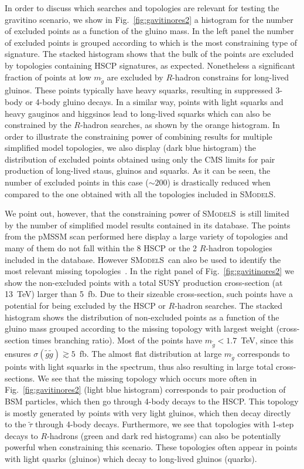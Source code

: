 \documentclass[preprint,number,sort&compress,twocolumn,3p]{elsstyarticle}
\newcommand{\smo}{\textsc{SModelS}}
\begin{document}
In order to discuss which searches and topologies are relevant for testing the gravitino scenario, we show in Fig.~\ref{fig:gavitinores2} a histogram for the number of excluded points as a function of the gluino mass. 
In the left panel the number of excluded points is grouped according to which is the most constraining type of signature. The stacked histogram shows that the bulk of the points are excluded by topologies containing HSCP signatures, as expected.
Nonetheless a significant fraction of points at low $m_{\tilde g}$ are excluded by $R$-hadron constrains for long-lived gluinos. These points typically have heavy squarks, resulting in suppressed 3-body or 4-body gluino decays. In a similar way, points with light squarks and heavy gauginos and higgsinos lead to long-lived squarks which can also be constrained by the $R$-hadron searches, as shown by the orange histogram.
In order to illustrate the constraining power of combining results for multiple simplified model topologies, we also display (dark blue histogram) the distribution of excluded points obtained using only the CMS limits for pair production of long-lived staus, gluinos and squarks.
As it can be seen, the number of excluded points in this case ($\sim200$) is drastically reduced when compared to the one obtained with all the topologies included in \smo.


We point out, however, that the constraining power of \smo\ is still limited by the number of simplified model results contained in its database. The points from the pMSSM scan performed here
display a large variety of topologies and many of them do not fall within the 8 HSCP or the 2 $R$-hadron topologies included in the database.
However \smo\ can also be used to identify the most relevant missing topologies~\cite{Kraml:2013mwa,Ambrogi:2017lov,Ambrogi:2017neo}.
In the right panel of Fig.~\ref{fig:gavitinores2}
we show the non-excluded points with a total SUSY production cross-section (at 13~TeV) larger than 5~fb. Due to their sizeable cross-section, such points have a potential for being excluded by the HSCP or $R$-hadron searches. The stacked histogram shows the distribution of non-excluded points as a function of the gluino mass grouped according to the missing topology with largest weight (cross-section times branching ratio). 
Most of the points have  $m_{\tilde g} < 1.7$~TeV, since this ensures $\sigma(\tilde g \tilde g) \gtrsim 5$~fb.
The almost flat distribution at large $m_{\tilde g}$ corresponds to points with light squarks in the spectrum, thus also resulting in large total cross-sections.
We see that the missing topology which occurs more often in Fig.~\ref{fig:gavitinores2} (light blue histogram) corresponds to pair production of BSM particles, which then go through 4-body decays to the HSCP. This topology is mostly generated by points with very light gluinos, which then decay directly to the $\tilde{\tau}$ through 4-body decays.
Furthermore, we see that topologies with 1-step decays to $R$-hadrons (green and dark red histograms) can also be potentially powerful when constraining this scenario. These topologies often appear in points with light quarks (gluinos) which decay to long-lived gluinos (quarks).
\end{document}
